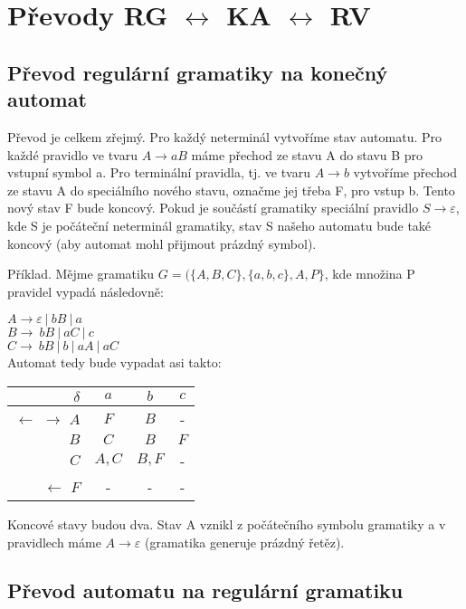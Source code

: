 \documentclass{article}
\begin{document}
\section{Převody RG $\leftrightarrow$ KA $\leftrightarrow$ RV}

\subsection{Převod regulární gramatiky na konečný automat}
Převod je celkem zřejmý.
Pro každý neterminál vytvoříme stav automatu.
Pro každé pravidlo ve tvaru $A \rightarrow aB$ máme přechod ze stavu A do stavu B pro vstupní symbol a.
Pro terminální pravidla, tj. ve tvaru $A \rightarrow b$ vytvoříme přechod ze stavu A do speciálního nového stavu, označme jej třeba F, pro vstup b. 
Tento nový stav F bude koncový. Pokud je součástí gramatiky speciální pravidlo $S \rightarrow \varepsilon$, kde S je počáteční neterminál gramatiky, stav S našeho automatu bude také koncový (aby automat mohl přijmout prázdný symbol).

Příklad. Mějme gramatiku $G = (\{A, B, C\}, \{a, b, c\}, A, P\}$, kde množina P pravidel vypadá následovně:

\noindent
$A \rightarrow \varepsilon ~ | ~bB ~ | ~a$\\
$B \rightarrow ~ bB ~ | ~aC~ | ~c$\\
$C \rightarrow ~bB~ | ~b~ | ~aA~ | ~aC$\\

Automat tedy bude vypadat asi takto:

\begin{tabular}{|r||c|c|c|}
\hline
 $\delta$ &      $a$ &   $b$ &   $c$\\
\hline
\hline
$\leftarrow$ $\rightarrow$ $A$ &        $F$ &   $B$ &   -\\
$B$ &   $C$ &   $B$ &   $F$\\
$C$ &   $A,C$ & $B,F$ & -\\
$\leftarrow$ $F$ &      - &     - &     -\\
\hline
\end{tabular}


Koncové stavy budou dva. Stav A vznikl z počátečního symbolu gramatiky a v pravidlech máme $A \rightarrow \varepsilon$ (gramatika generuje prázdný řetěz).

\subsection{Převod automatu na regulární gramatiku}
\end{document}
